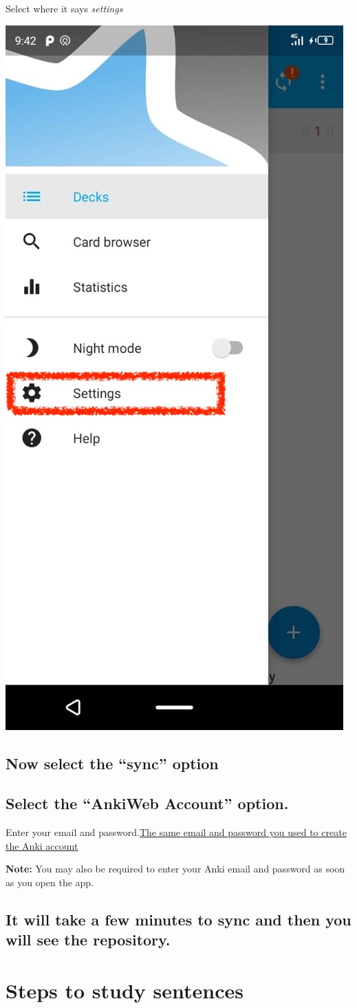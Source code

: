\documentclass[
]{book}
\begin{document}
Select where it says \emph{settings}

\includegraphics[width=0.3\linewidth]{images/reposit_en/menu_config}

\hypertarget{now-select-the-sync-option}{%
\section{Now select the ``sync'' option}\label{now-select-the-sync-option}}

\hypertarget{select-the-ankiweb-account-option.}{%
\section{Select the ``AnkiWeb Account'' option.}\label{select-the-ankiweb-account-option.}}

Enter your email and password.\protect\hyperlink{cross_3}{The same email and password you used to create the Anki account}

\textbf{Note:} You may also be required to enter your Anki email and password as soon as you open the app.

\hypertarget{it-will-take-a-few-minutes-to-sync-and-then-you-will-see-the-repository.}{%
\section{It will take a few minutes to sync and then you will see the repository.}\label{it-will-take-a-few-minutes-to-sync-and-then-you-will-see-the-repository.}}

\hypertarget{cross_5}{%
\chapter{Steps to study sentences}\label{cross_5}}
\end{document}
